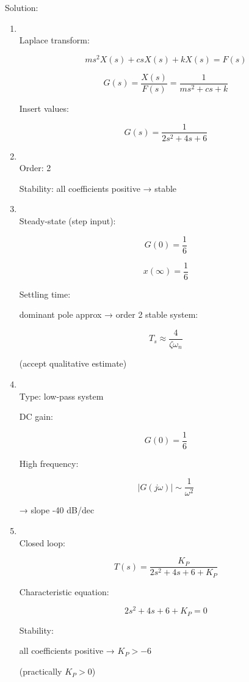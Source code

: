 \documentclass[a4paper,12pt]{article}
\newif\ifshowsolutions
\begin{document}
\ifshowsolutions
Solution:

\begin{enumerate}

\item[(a)]~\\

Laplace transform:

\[
ms^2X(s)+csX(s)+kX(s)=F(s)
\]

\[
G(s)=\frac{X(s)}{F(s)}=\frac{1}{ms^2+cs+k}
\]

Insert values:

\[
G(s)=\frac{1}{2s^2+4s+6}
\]

\item[(b)]~\\

Order: 2

Stability: all coefficients positive → stable

\item[(c)]~\\

Steady-state (step input):

\[
G(0)=\frac{1}{6}
\]

\[
x(\infty)=\frac{1}{6}
\]

Settling time:

dominant pole approx → order 2 stable system:

\[
T_s \approx \frac{4}{\zeta\omega_n}
\]

(accept qualitative estimate)

\item[(d)]~\\

Type: low-pass system

DC gain:

\[
G(0)=\frac{1}{6}
\]

High frequency:

\[
|G(j\omega)| \sim \frac{1}{\omega^2}
\]

→ slope -40 dB/dec

\item[(e)]~\\

Closed loop:

\[
T(s)=\frac{K_P}{2s^2+4s+6+K_P}
\]

Characteristic equation:

\[
2s^2+4s+6+K_P=0
\]

Stability:

all coefficients positive → $K_P>-6$

(practically $K_P>0$)


\end{enumerate}
\end{document}
